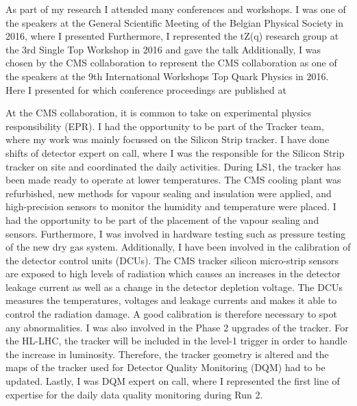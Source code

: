 \newpage\thispagestyle{empty}
As part of my research I attended many conferences and workshops. I was one of the speakers at  the General Scientific Meeting of the Belgian Physical Society in 2016, where I presented
\vspace{+2ex}
\vspace{-2ex}
Furthermore, I represented the tZ(q) research group at the 3rd Single Top Workshop in 2016 and gave the talk
\vspace{+2ex}
\vspace{-2ex}
Additionally, I was chosen by the CMS collaboration to represent the CMS collaboration as one of the speakers at the 9th International Workshops Top Quark Physics in 2016. Here I presented 
\vspace{+2ex}
\vspace{-2ex}
for which conference proceedings are published at 
\vspace{+2ex}
\vspace{-2ex}


At the CMS collaboration, it is common to take on experimental physics responsibility (EPR). I had the opportunity to be part of the Tracker team, where my work was mainly focussed on the Silicon Strip tracker. I have done shifts of detector expert on call, where I was the responsible for the Silicon Strip tracker on site and coordinated the daily activities. During LS1, the tracker has been made ready to operate at lower temperatures. The CMS cooling plant was refurbished, new methods for vapour sealing and insulation were applied, and high-precision sensors to monitor the humidity and temperature were placed. I had the opportunity to be part of the placement of the vapour sealing and sensors. Furthermore, I was involved in hardware testing such as pressure testing of the new dry gas system. Additionally, I have been involved in the calibration of the detector control units (DCUs). The CMS tracker silicon micro-strip sensors are exposed to high levels of radiation which causes an increases in the detector leakage current as well as a change in the detector depletion voltage. The DCUs measures the temperatures, voltages and leakage currents and makes it able to control the radiation damage. A good calibration is therefore necessary to spot any abnormalities.  I was also involved in the Phase 2 upgrades of the tracker. For the HL-LHC, the tracker will be included in the level-1 trigger in order to handle the increase in luminosity. Therefore, the tracker geometry is altered and the maps of the tracker used for Detector Quality Monitoring (DQM) had to be updated. Lastly, I was DQM expert on call, where I represented the first line of expertise for the daily data quality monitoring during Run 2. 

